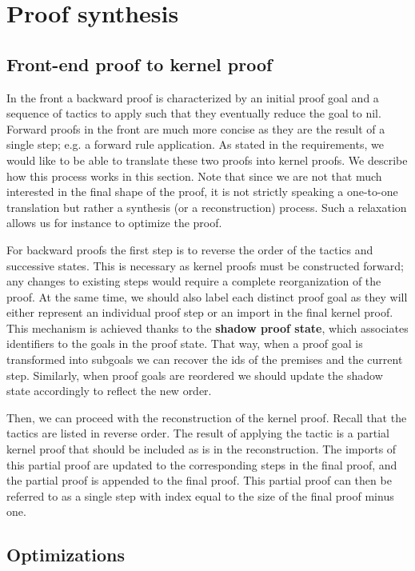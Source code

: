 \section{Proof synthesis}
\label{sec:synthesis}

\subsection{Front-end proof to kernel proof}

In the front a backward proof is characterized by an initial proof goal and a sequence of tactics to apply such that they eventually reduce the goal to nil. Forward proofs in the front are much more concise as they are the result of a single step; e.g. a forward rule application. As stated in the requirements, we would like to be able to translate these two proofs into kernel proofs. We describe how this process works in this section. Note that since we are not that much interested in the final shape of the proof, it is not strictly speaking a one-to-one translation but rather a synthesis (or a reconstruction) process. Such a relaxation allows us for instance to optimize the proof.

For backward proofs the first step is to reverse the order of the tactics and successive states. This is necessary as kernel proofs must be constructed forward; any changes to existing steps would require a complete reorganization of the proof. At the same time, we should also label each distinct proof goal as they will either represent an individual proof step or an import in the final kernel proof. This mechanism is achieved thanks to the \textbf{shadow proof state}, which associates identifiers to the goals in the proof state. That way, when a proof goal is transformed into subgoals we can recover the ids of the premises and the current step. Similarly, when proof goals are reordered we should update the shadow state accordingly to reflect the new order.

Then, we can proceed with the reconstruction of the kernel proof. Recall that the tactics are listed in reverse order. The result of applying the tactic is a partial kernel proof that should be included as is in the reconstruction. The imports of this partial proof are updated to the corresponding steps in the final proof, and the partial proof is appended to the final proof. This partial proof can then be referred to as a single step with index equal to the size of the final proof minus one.

\subsection{Optimizations}

